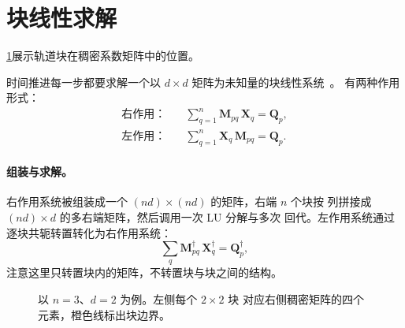 \section{块线性求解}
\label{sec:block-solve}

\cref{fig:block-assembly}展示轨道块在稠密系数矩阵中的位置。

时间推进每一步都要求解一个以 $d\times d$ 矩阵为未知量的块线性系统~\cite{golub2013}。
有两种作用形式：
\begin{align}
    \text{右作用：} & \quad \sum^{n}_{q=1} \bm{M}_{pq}\,\bm{X}_q
        = \bm{Q}_p, \label{eq:right-action}\\
    \text{左作用：} & \quad \sum^{n}_{q=1} \bm{X}_q\,\bm{M}_{pq}
        = \bm{Q}_p. \label{eq:left-action}
\end{align}

\paragraph{组装与求解。}
右作用系统被组装成一个 $(nd)\times(nd)$ 的矩阵，右端 $n$ 个块按
列拼接成 $(nd)\times d$ 的多右端矩阵，然后调用一次 LU 分解与多次
回代。左作用系统通过逐块共轭转置转化为右作用系统：
\begin{equation}
    \sum_q \bm{M}^{\dagger}_{pq}\,\bm{X}^{\dagger}_q
    = \bm{Q}^{\dagger}_p ,
    \label{eq:left-to-right}
\end{equation}
注意这里只转置块内的矩阵，不转置块与块之间的结构。

\begin{figure}[htbp]
    \centering
    \caption[块系统到稠密系统的组装]{以 $n=3$、$d=2$ 为例。左侧每个 $2\times2$ 块
             对应右侧稠密矩阵的四个元素，橙色线标出块边界。}
    \label{fig:block-assembly}
\end{figure}

